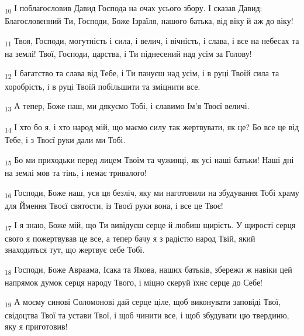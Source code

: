 \begin{tcolorbox}
\textsubscript{10} І поблагословив Давид Господа на очах усього збору. І сказав Давид: Благословенний Ти, Господи, Боже Ізраїля, нашого батька, від віку й аж до віку!
\end{tcolorbox}
\begin{tcolorbox}
\textsubscript{11} Твоя, Господи, могутність і сила, і велич, і вічність, і слава, і все на небесах та на землі! Твої, Господи, царства, і Ти піднесений над усім за Голову!
\end{tcolorbox}
\begin{tcolorbox}
\textsubscript{12} І багатство та слава від Тебе, і Ти пануєш над усім, і в руці Твоїй сила та хоробрість, і в руці Твоїй побільшити та зміцнити все.
\end{tcolorbox}
\begin{tcolorbox}
\textsubscript{13} А тепер, Боже наш, ми дякуємо Тобі, і славимо Ім'я Твоєї величі.
\end{tcolorbox}
\begin{tcolorbox}
\textsubscript{14} І хто бо я, і хто народ мій, що маємо силу так жертвувати, як це? Бо все це від Тебе, і з Твоєї руки дали ми Тобі.
\end{tcolorbox}
\begin{tcolorbox}
\textsubscript{15} Бо ми приходьки перед лицем Твоїм та чужинці, як усі наші батьки! Наші дні на землі мов та тінь, і немає тривалого!
\end{tcolorbox}
\begin{tcolorbox}
\textsubscript{16} Господи, Боже наш, уся ця безліч, яку ми наготовили на збудування Тобі храму для Ймення Твоєї святости, із Твоєї руки вона, і все це Твоє!
\end{tcolorbox}
\begin{tcolorbox}
\textsubscript{17} І я знаю, Боже мій, що Ти вивідуєш серце й любиш щирість. У щирості серця свого я пожертвував це все, а тепер бачу я з радістю народ Твій, який знаходиться тут, що жертвує себе Тобі.
\end{tcolorbox}
\begin{tcolorbox}
\textsubscript{18} Господи, Боже Авраама, Ісака та Якова, наших батьків, збережи ж навіки цей напрямок думок серця народу Твого, і міцно скеруй їхнє серце до Себе!
\end{tcolorbox}
\begin{tcolorbox}
\textsubscript{19} А моєму синові Соломонові дай серце ціле, щоб виконувати заповіді Твої, свідоцтва Твої та устави Твої, і щоб чинити все, і щоб збудувати цю твердиню, яку я приготовив!
\end{tcolorbox}
